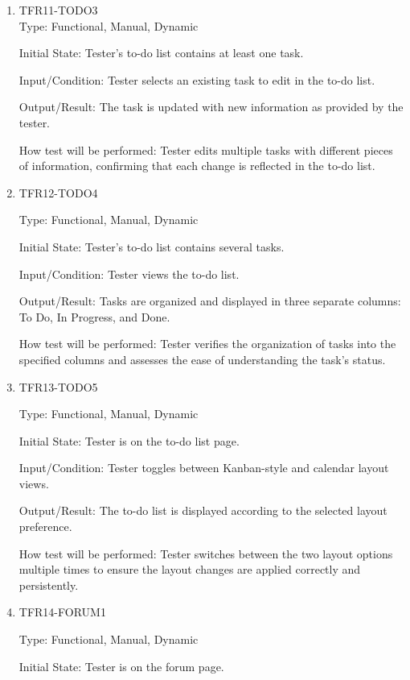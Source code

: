 \documentclass[12pt, titlepage]{article}
\begin{document}
\begin{enumerate}
\item{TFR11-TODO3\\}\label{TFR11-TODO3}
Type: Functional, Manual, Dynamic

Initial State: Tester's to-do list contains at least one task.

Input/Condition: Tester selects an existing task to edit in the to-do list.

Output/Result: The task is updated with new information as provided by the tester.

How test will be performed: Tester edits multiple tasks with different pieces of information, confirming that each change is reflected in the to-do list.


\item{TFR12-TODO4\\}\label{TFR12-TODO4}

Type: Functional, Manual, Dynamic

Initial State: Tester's to-do list contains several tasks.

Input/Condition: Tester views the to-do list.

Output/Result: Tasks are organized and displayed in three separate columns: To Do, In Progress, and Done.

How test will be performed: Tester verifies the organization of tasks into the specified columns and assesses the ease of understanding the task's status.


\item{TFR13-TODO5\\}\label{TFR13-TODO5}

Type: Functional, Manual, Dynamic

Initial State: Tester is on the to-do list page.

Input/Condition: Tester toggles between Kanban-style and calendar layout views.

Output/Result: The to-do list is displayed according to the selected layout preference.

How test will be performed: Tester switches between the two layout options multiple times to ensure the layout changes are applied correctly and persistently.


\item{TFR14-FORUM1\\}\label{TFR14-FORUM1}

Type: Functional, Manual, Dynamic

Initial State: Tester is on the forum page.


\end{enumerate}
\end{document}
